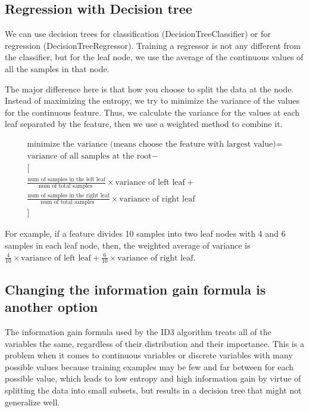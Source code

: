 \documentclass[12pt]{report}
\begin{document}
\subsection{Regression with Decision tree}

We can use decision trees for classification (DecisionTreeClassifier) or for regression (DecisionTreeRegressor). Training a regressor is not any different from the classifier, but for the leaf node, we use the average of the continuous values of all the samples in that node.

The major difference here is that how you choose to split the data at the node. Instead of maximizing the entropy, we try to minimize the variance of the values for the continuous feature. Thus, we calculate the variance for the values at each leaf separated by the feature, then we use a weighted method to combine it.

\begin{multline}
	\text{minimize the variance (means choose the feature with largest value)} = \\
	\text{variance of all samples at the root} - \\
	\big[ \\
	\frac{\text{num of samples in the left leaf}}{ \text{num of total samples }} \times \text{variance of left leaf} +\\
	\frac{\text{num of samples in the right leaf}}{ \text{num of total samples }} \times \text{variance of right leaf}\\
	\big]
\end{multline}



For example, if a feature divides 10 samples into two leaf nodes with 4 and 6 samples in each leaf node, then, the weighted average of variance is $\frac{4}{10} \times \text{variance of left leaf} + \frac{6}{10} \times \text{variance of right leaf} $.

\subsection{Changing the information gain formula is another option}
The information gain formula used by the ID3 algorithm treats all of the variables the same, regardless of their distribution and their importance. This is a problem when it comes to continuous variables or discrete variables with many possible values because training examples may be few and far between for each possible value, which leads to low entropy and high information gain by virtue of splitting the data into small subsets, but results in a decision tree that might not generalize well.
\end{document}

